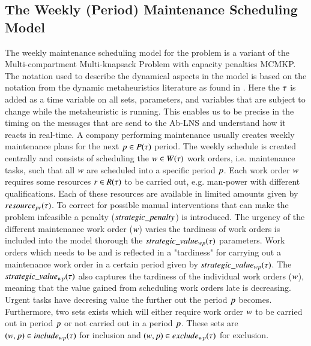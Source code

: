 \subsection{The Weekly (Period) Maintenance Scheduling Model}
The weekly maintenance scheduling model for the problem
is a variant of the  Multi-compartment Multi-knapsack Problem with capacity penalties MCMKP.
The notation used to describe the dynamical aspects in the model is based on the notation
from the dynamic metaheuristics literature as found in \cite{yangMetaheuristicsDynamicCombinatorial2013}.
Here the $\tau$ is added as a time variable on all sets, parameters, and variables that are
subject to change while the metaheuristic is running. This enables us to be precise in the timing on
the messages that are send to the Ab-LNS and understand how it reacts in real-time.
A company performing maintenance usually creates weekly maintenance plans for
the next $p \in P(\tau)$ period. The weekly schedule is created
centrally and consists of scheduling the $\ElementWorkOrder \in \SetWorkOrder$
work orders, i.e. maintenance tasks, such that all $w$
are scheduled into a specific period $p$. Each work order $
w$ requires some resources $r \in R(\tau)$
to be carried out, e.g. man-power with different qualifications. Each of these
resources are available in limited amounts given by $\ParStrategicResource$. 
To correct for possible manual interventions that can make the problem 
infeasible a penalty ($strategic\_penalty$) is introduced. The urgency of 
the different maintenance work order ($w$) varies the tardiness 
of work orders is included into the model thorough the $strategic\_value_{w p}(\tau)$ 
parameters. Work orders which needs to be and is reflected in a "tardiness" 
for carrying out a maintenance work order in a certain period given by 
$strategic\_value_{w p}(\tau)$. The $strategic\_value_{w p}(\tau)$ also captures the tardiness of the
individual work orders ($w$), meaning that
the value gained from scheduling work orders late is decreasing. Urgent tasks have
decresing value the further out the period $p$ becomes.
Furthermore, two sets exists which will either require work order $w$ to be carried
out in period $p$ or not carried out in a period $p$.
These sets are $(w,p) \in
include_{wp}(\tau)$ for inclusion and  $(w, p) \in
exclude_{wp}(\tau)$ for exclusion.

